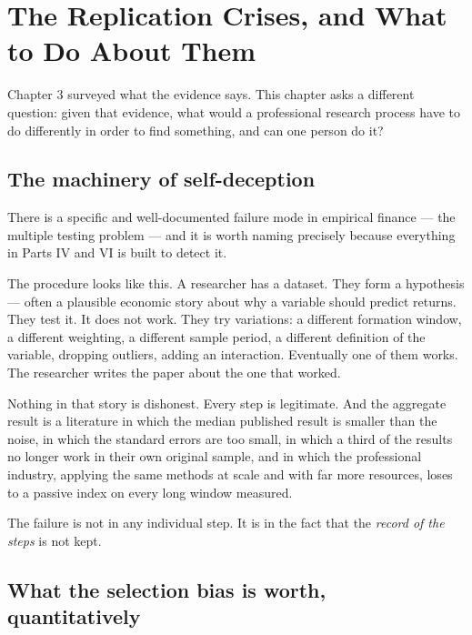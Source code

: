 
\chapter{The Replication Crises, and What to Do About Them}
\label{ch:replication-crisis}

Chapter 3 surveyed what the evidence says. This chapter asks a different
question: given that evidence, what would a professional research process
have to do differently in order to find something, and can one person do
it?

\section{The machinery of self-deception}

There is a specific and well-documented failure mode in empirical finance ---
the multiple testing problem --- and it is worth naming precisely because
everything in Parts IV and VI is built to detect it.

The procedure looks like this. A researcher has a dataset. They form a
hypothesis --- often a plausible economic story about why a variable should
predict returns. They test it. It does not work. They try variations: a
different formation window, a different weighting, a different sample
period, a different definition of the variable, dropping outliers, adding
an interaction. Eventually one of them works. The researcher writes the
paper about the one that worked.

Nothing in that story is dishonest. Every step is legitimate. And the
aggregate result is a literature in which the median published result is
smaller than the noise, in which the standard errors are too small, in
which a third of the results no longer work in their own original sample,
and in which the professional industry, applying the same methods at scale
and with far more resources, loses to a passive index on every long window
measured.

The failure is not in any individual step. It is in the fact that the
\emph{record of the steps} is not kept.

\section{What the selection bias is worth, quantitatively}

